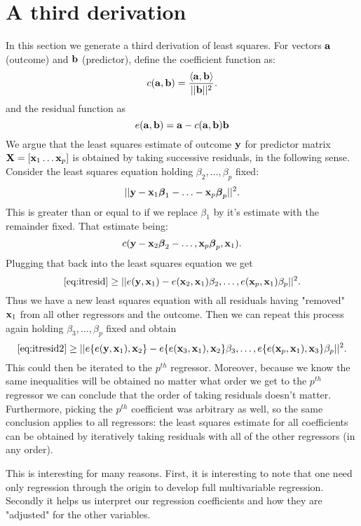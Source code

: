 \section{A third derivation}
In this section we generate a third derivation
of least squares. 
For vectors $\mathbf{a}$ (outcome) and $\mathbf{b}$ (predictor), define the coefficient function as:
$$
c(\mathbf{a}, \mathbf{b})
= \frac{\langle \mathbf{a}, \mathbf{b} \rangle}{|| \mathbf{b} ||^2}.
$$
and the residual function as
$$
e(\mathbf{a}, \mathbf{b}) = \mathbf{a} - c(\mathbf{a}, \mathbf{b}) \mathbf{b}
$$
We argue that the least squares estimate of outcome
$\mathbf{y}$ for predictor matrix $\mathbf{X} = [\mathbf{x}_1 \ldots \mathbf{x}_p]$
is obtained by taking successive residuals, in the following sense. Consider the least squares
equation holding $\beta_2, \ldots, \beta_p$ fixed:
\begin{equation}
\label{eq:itresid}
|| \mathbf{y} - \mathbf{x}_1 \boldsymbol{\beta}_1 - \ldots - \mathbf{x}_p \boldsymbol{\beta}_p||^2.
\end{equation}
This is greater than or equal to
if we replace $\beta_1$ by it's
estimate with the remainder fixed. That estimate
being:
$$
c(\mathbf{y} - \mathbf{x}_2 \boldsymbol{\beta}_2 - \ldots, \mathbf{x}_p \boldsymbol{\beta}_p, \mathbf{x}_1).
$$
Plugging that back into the least squares equation we
get
\begin{equation}
\label{eq:itresid2}
\eqref{eq:itresid}\geq ||e(\mathbf{y}, \mathbf{x}_1) - 
e(\mathbf{x}_2, \mathbf{x}_1) \beta_2, \ldots, e(\mathbf{x}_p, \mathbf{x}_1) \beta_p||^2.
\end{equation}
Thus we have a new least squares equation with 
all residuals having "removed" $\mathbf{x}_1$ from all other
regressors and the outcome. Then we can repeat this
process again holding $\beta_3, \ldots, \beta_p$
fixed and obtain
$$
\eqref{eq:itresid2}\geq ||e\{e(\mathbf{y}, \mathbf{x}_1), \mathbf{x}_2\} - 
e\{e(\mathbf{x}_3, \mathbf{x}_1), \mathbf{x}_2\} \beta_3, \ldots, e\{e(\mathbf{x}_p, \mathbf{x}_1), \mathbf{x}_3\} \beta_p||^2.
$$
This could then be iterated to the $p^{th}$ regressor.
Moreover, because we know the same inequalities will be
obtained no matter what order we get to the $p^{th}$
regressor we can conclude that the order of taking
residuals doesn't matter. Furthermore, picking the
$p^{th}$ coefficient was arbitrary as well, so the
same conclusion applies to all regressors: the
least squares estimate for all coefficients can be
obtained by iteratively taking residuals with all of the
other regressors (in any order). 

This is interesting for many reasons. First, it
is interesting to note that one need only 
regression through the origin to develop full
multivariable regression. Secondly it helps
us interpret our regression coefficients and
how they are "adjusted" for the other variables.

